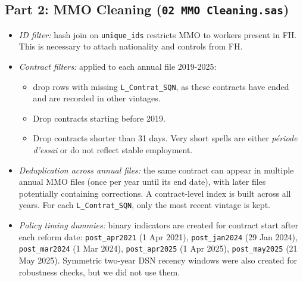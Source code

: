 \documentclass[10pt, a4paper]{article}
\begin{document}
\subsection*{Part 2: MMO Cleaning \textnormal{\small(\texttt{02 MMO Cleaning.sas})}}
\smallskip
\begin{itemize}
  \item \textit{ID filter:} hash join on \texttt{unique\_ids} restricts MMO
  to workers present in FH. This is necessary to attach nationality and
  controls from FH.
  \smallskip
  \item \textit{Contract filters:} applied to each annual file 2019-2025:
  \begin{itemize}
    \item drop rows with missing \texttt{L\_Contrat\_SQN}, as these contracts have ended and are recorded in other vintages.
    \item Drop contracts starting before 2019.
    \item Drop contracts shorter than 31 days. Very short spells are either \textit{période d'essai} or do not reflect stable employment.
  \end{itemize}
  \smallskip
  \item \textit{Deduplication across annual files:} the same contract can
  appear in multiple annual MMO files (once per year until its end date),
  with later files potentially containing corrections. A contract-level
  index is built across all years. For each \texttt{L\_Contrat\_SQN},
  only the most recent vintage is kept.
  \smallskip
  \item \textit{Policy timing dummies:} binary indicators are created for
  contract start after each reform date: \texttt{post\_apr2021} (1 Apr 2021),
  \texttt{post\_jan2024} (29 Jan 2024), \texttt{post\_mar2024} (1 Mar 2024),
  \texttt{post\_apr2025} (1 Apr 2025), \texttt{post\_may2025} (21 May 2025).
  Symmetric two-year DSN recency windows were also created for robustness checks, but we did not use them. 
\end{itemize}
\bigskip
\end{document}
